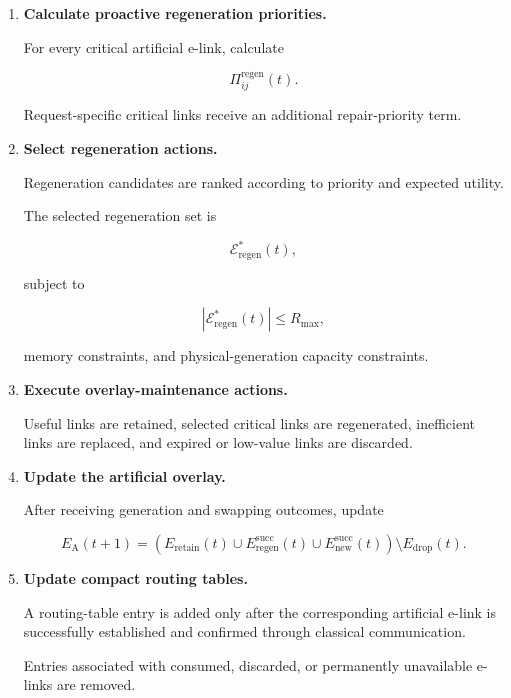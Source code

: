 \begin{enumerate}
and

\begin{equation}
    \mathcal{R}_{s,d}^{\mathrm{repair}}(t)
    =
    \emptyset,
\end{equation}

the request is classified as temporarily infeasible.

Depending on the request deadline, the controller either postpones or rejects the request.


\item \textbf{Calculate proactive regeneration priorities.}

For every critical artificial e-link, calculate

\begin{equation}
    \Pi_{ij}^{\mathrm{regen}}(t).
\end{equation}

Request-specific critical links receive an additional repair-priority term.


\item \textbf{Select regeneration actions.}

Regeneration candidates are ranked according to priority and expected utility.

The selected regeneration set is

\begin{equation}
    \mathcal{E}_{\mathrm{regen}}^{*}(t),
\end{equation}

subject to

\begin{equation}
    \left|
    \mathcal{E}_{\mathrm{regen}}^{*}(t)
    \right|
    \leq
    R_{\max},
\end{equation}

memory constraints, and physical-generation capacity constraints.


\item \textbf{Execute overlay-maintenance actions.}

Useful links are retained, selected critical links are regenerated, inefficient links are replaced, and expired or low-value links are discarded.


\item \textbf{Update the artificial overlay.}

After receiving generation and swapping outcomes, update

\begin{equation}
    E_{\mathrm{A}}(t+1)
    =
    \left(
    E_{\mathrm{retain}}(t)
    \cup
    E_{\mathrm{regen}}^{\mathrm{succ}}(t)
    \cup
    E_{\mathrm{new}}^{\mathrm{succ}}(t)
    \right)
    \setminus
    E_{\mathrm{drop}}(t).
\end{equation}


\item \textbf{Update compact routing tables.}

A routing-table entry is added only after the corresponding artificial e-link is successfully established and confirmed through classical communication.

Entries associated with consumed, discarded, or permanently unavailable e-links are removed.
\end{enumerate}

